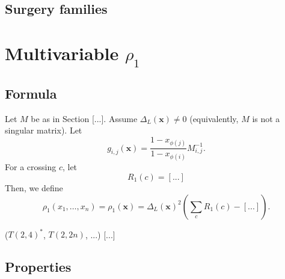 \documentclass[11pt,e-only]{amsart}
\begin{document}
\subsection{Surgery families}


\section{Multivariable $\rho_1$}

\subsection{Formula}

Let $M$ be as in Section [...]. Assume $\Delta_L(\mathbf{x})\neq 0$ (equivalently, $M$ is not a singular matrix). Let
\begin{equation}
    g_{i,j}(\mathbf{x})= \frac{1-x_{\phi(j)}}{1-x_{\phi(i)}}M^{-1}_{i,j}.
\end{equation}
For a crossing $c$, let
\begin{equation}
    R_1(c)=[...]
\end{equation}
Then, we define
\begin{equation}
    \rho_1(x_1,\dots,x_n)=\rho_1(\mathbf{x})=\Delta_L(\mathbf{x})^2\left(\sum_{c} R_1(c)-[...]\right).
\end{equation}

\begin{example} ($T(2,4)^*$, $T(2,2n)$, ...) [...]
\end{example}

\begin{example} 
\end{example}

\begin{example}
\end{example}


\subsection{Properties}

\end{document}
